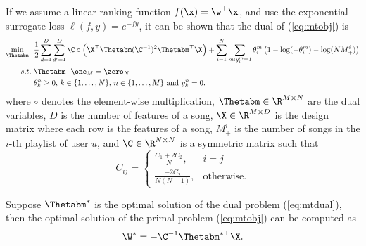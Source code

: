If we assume a linear ranking function $f(\x) = \w^\top \x$, 
and use the exponential surrogate loss $\ell(f, y) = e^{-fy}$,
it can be shown that the dual of (\ref{eq:mtobj}) is
\begin{equation}
\label{eq:mtdual}
\begin{aligned}
\min_{\Thetabm} \ \ & \frac{1}{2} \sum_{d=1}^{D} \sum_{d'=1}^{D} \C \circ \left( \X^\top \Thetabm (\C^{-1})^2 \Thetabm^\top \X \right) 
    + \sum_{i = 1}^{N} \sum_{m: y_i^m = 1} \theta_i^m \left( 1 - \log(-\theta_i^m) - \log(N M_+^i) \right) \\
s.t. \ & \Thetabm^\top \one_M = \zero_{N} \\
       & \theta_k^n \ge 0, \, k \in \{1,\dots,N\}, \, n \in \{1,\dots,M\} \ \mathrm{and} \ y_k^n = 0.
\end{aligned}
\end{equation}
where $\circ$ denotes the element-wise multiplication,
$\Thetabm \in \R^{M \times N}$ are the dual variables, $D$ is the number of features of a song, 
$\X \in \R^{M \times D}$ is the design matrix where each row is the features of a song,
$M_+^i$ is the number of songs in the $i$-th playlist of user $u$,
and $\C \in \R^{N \times N}$ is a symmetric matrix such that
\begin{equation*}
C_{ij} = \begin{cases}
\frac{C_1 + 2C_2}{N}, & i = j \\
\frac{-2C_2}{N (N - 1)},  & \mathrm{otherwise}.
\end{cases}
\end{equation*}

Suppose $\Thetabm^*$ is the optimal solution of the dual problem (\ref{eq:mtdual}), 
then the optimal solution of the primal problem (\ref{eq:mtobj}) can be computed as
\begin{equation*}
\W^* = -\C^{-1} \Thetabm^{*\top} \X.
\end{equation*}




